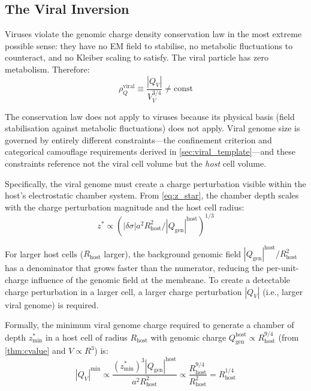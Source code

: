 \documentclass[12pt,a4paper]{article}
\theoremstyle{definition}
\theoremstyle{remark}
\newcommand{\Qgen}{Q_{\mathrm{gen}}}
\newcommand{\abs}[1]{\left|#1\right|}
\newcommand{\zstar}{z^{*}}
\begin{document}
\subsection{The Viral Inversion}

Viruses violate the genomic charge density conservation law in the most extreme possible sense: they have no EM field to stabilise, no metabolic fluctuations to counteract, and no Kleiber scaling to satisfy. The viral particle has zero metabolism. Therefore:
\begin{equation}
  \rho_Q^{\mathrm{viral}} \equiv \frac{\abs{Q_V}}{V_V^{3/4}} \neq \mathrm{const}
\end{equation}

The conservation law does not apply to viruses because its physical basis (field stabilisation against metabolic fluctuations) does not apply. Viral genome size is governed by entirely different constraints---the confinement criterion and categorical camouflage requirements derived in \cref{sec:viral_template}---and these constraints reference not the viral cell volume but the \emph{host} cell volume.

Specifically, the viral genome must create a charge perturbation visible within the host's electrostatic chamber system. From \cref{eq:z_star}, the chamber depth scales with the charge perturbation magnitude and the host cell radius:
\begin{equation}
  \zstar \propto \left(\abs{\delta\sigma} a^2 R_{\mathrm{host}}^2 / \abs{\Qgen}^{\mathrm{host}}\right)^{1/3}
\end{equation}

For larger host cells ($R_{\mathrm{host}}$ larger), the background genomic field $\abs{\Qgen}^{\mathrm{host}} / R_{\mathrm{host}}^2$ has a denominator that grows faster than the numerator, reducing the per-unit-charge influence of the genomic field at the membrane. To create a detectable charge perturbation in a larger cell, a larger charge perturbation $\abs{Q_V}$ (i.e., larger viral genome) is required.

Formally, the minimum viral genome charge required to generate a chamber of depth $z^{*}_{\mathrm{min}}$ in a host cell of radius $R_{\mathrm{host}}$ with genomic charge $\Qgen^{\mathrm{host}} \propto R_{\mathrm{host}}^{9/4}$ (from \cref{thm:cvalue} and $V \propto R^3$) is:
\begin{equation}
  \abs{Q_V}^{\mathrm{min}} \propto \frac{(z^{*}_{\mathrm{min}})^3 \abs{\Qgen}^{\mathrm{host}}}{a^2 R_{\mathrm{host}}^2} \propto \frac{R_{\mathrm{host}}^{9/4}}{R_{\mathrm{host}}^2} = R_{\mathrm{host}}^{1/4}
\end{equation}
\end{document}
